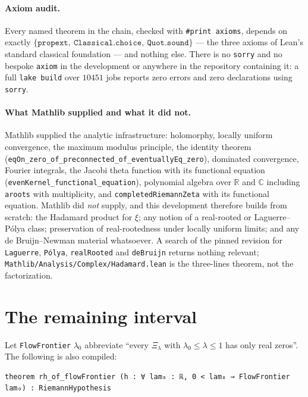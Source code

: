 \documentclass[11pt]{article}
\theoremstyle{definition}
\begin{document}
\paragraph{Axiom audit.}  Every named theorem in the chain, checked with \verb|#print axioms|,
depends on exactly $\{\texttt{propext},\ \texttt{Classical.choice},\ \texttt{Quot.sound}\}$ --- the
three axioms of Lean's standard classical foundation --- and nothing else.  There is no \texttt{sorry}
and no bespoke \texttt{axiom} in the development or anywhere in the repository containing it: a full
\verb|lake build| over $10451$ jobs reports zero errors and zero declarations using \texttt{sorry}.

\paragraph{What Mathlib supplied and what it did not.}  Mathlib supplied the analytic infrastructure:
holomorphy, locally uniform convergence, the maximum modulus principle, the identity theorem
(\texttt{eqOn\_zero\_of\_preconnected\_of\_eventuallyEq\_zero}), dominated convergence, Fourier
integrals, the Jacobi theta function with its functional equation
(\texttt{evenKernel\_functional\_equation}), polynomial algebra over $\mathbb R$ and $\mathbb C$
including \texttt{aroots} with
multiplicity, and \texttt{completedRiemannZeta} with its functional equation.  Mathlib did \emph{not}
supply, and this development therefore builds from scratch: the Hadamard product for $\xi$; any notion
of a real-rooted or Laguerre--P\'olya class; preservation of real-rootedness under locally uniform
limits; and any de Bruijn--Newman material whatsoever.  A search of the pinned revision for
\texttt{Laguerre}, \texttt{P\'olya}, \texttt{realRooted} and \texttt{deBruijn} returns nothing relevant;
\texttt{Mathlib/Analysis/Complex/Hadamard.lean} is the three-lines theorem, not the factorization.

\section{The remaining interval}\label{sec:remaining}

Let \texttt{FlowFrontier} $\lambda_0$ abbreviate ``every $\Xi_\lambda$ with
$\lambda_0\le\lambda\le1$ has only real zeros''.  The following is also compiled:

\begin{lstlisting}
theorem rh_of_flowFrontier (h : ∀ lam₀ : ℝ, 0 < lam₀ → FlowFrontier lam₀) : RiemannHypothesis
\end{lstlisting}
\end{document}
